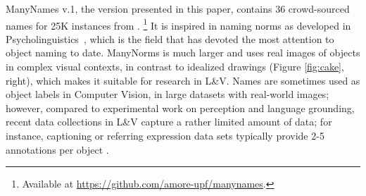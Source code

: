 ManyNames v.1, the version presented in this paper, contains 36 crowd-sourced names for 25K instances from \vgenome \cite{krishna2016visualgenome}.%
\footnote{Available at \url{https://github.com/amore-upf/manynames}.}
It is inspired in naming norms as developed in Psycholinguistics~\cite{snodgrass,rossion2004revisiting}, which is the field that has devoted the most attention to object naming to date.
ManyNorms is much larger and uses real images of objects in complex visual contexts, in contrast to idealized drawings (Figure \ref{fig:cake}, right), which makes it suitable for research in L\&V.
Names are sometimes used as object labels in Computer Vision, in large datasets with real-world images; however, compared to experimental work on perception and language grounding, recent data collections in L\&V capture a rather limited amount of data; for instance, captioning or referring expression data sets typically provide 2-5 annotations per object \cite{devlin:imcaqui,Kazemzadeh2014,mao15}.

